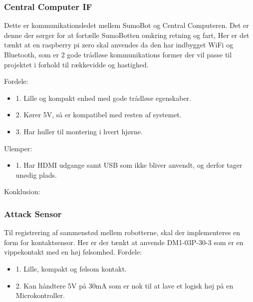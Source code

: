                 


\subsubsection*{\textbf{Central Computer IF}}
Dette er kommunikationsledet mellem SumoBot og Central Computeren. Det er denne der sørger for at fortælle SumoBotten omkring retning og fart, 
Her er det tænkt at en raspberry pi zero skal anvendes da den har indbygget WiFi og Bluetooth, som er 2 gode trådløse kommunikations former der vil passe til projektet i forhold til rækkevidde og hastighed. 

    Fordele: 
    \begin{itemize}
    \item 1. Lille og kompakt enhed med gode trådløse egenskaber.
    \item 2. Kører 5V, så er kompatibel med resten af systemet.
    \item 3. Har huller til montering i hvert hjørne.
    \end{itemize}
    Ulemper: 
    \begin{itemize}
    \item 1. Har HDMI udgange samt USB som ikke bliver anvendt, og derfor tager unødig plads.
    \end{itemize}
    Konklusion:

\subsubsection*{\textbf{Attack Sensor}}
Til registrering af sammenstød mellem robotterne, skal der implementeres en form for kontaktsensor.
Her er der tænkt at anvende DM1-03P-30-3  som er en vippekontakt med en høj følsomhed\cite{DM1-03P-30-3Data}.
Fordele: 
\begin{itemize}
\item 1. Lille, kompakt og følsom kontakt.
\item 2. Kan håndtere 5V på 30mA som er nok til at lave et logisk høj på en Microkontroller.
\end{itemize}

